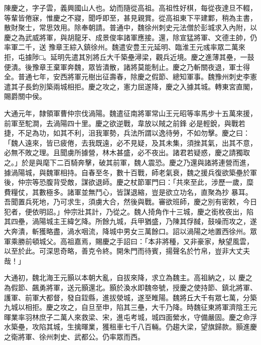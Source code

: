 
\begin{pinyinscope}

 陳慶之，字子雲，義興國山人也。幼而隨從高祖。高祖性好棋，每從夜達旦不輟，等輩皆倦寐，惟慶之不寢，聞呼即至，甚見親賞。從高祖東下平建鄴，稍為主書，散財聚士，常思效用。除奉朝請。普通中，魏徐州刺史元法僧於彭城求入內附，以慶之為武威將軍，與胡龍牙、成景俊率諸軍應接。還，除宣猛將軍、文德主帥，仍率軍二千，送
 豫章王綜入鎮徐州。魏遣安豊王元延明、臨淮王元彧率眾二萬來拒，屯據陟□。延明先遣其別將丘大千築壘潯梁，觀兵近境。慶之進薄其壘，一鼓便潰。後豫章王棄軍奔魏，眾皆潰散，諸將莫能制止。慶之乃斬關夜退，軍士得全。普通七年，安西將軍元樹出征壽春，除慶之假節、總知軍事。魏豫州刺史李憲遣其子長鈞別築兩城相拒。慶之攻之，憲力屈遂降，慶之入據其城。轉東宮直閣，賜爵關中侯。



 大通元年，隸領軍曹仲宗伐渦陽。魏遣征南將軍常山王元昭等率馬步十五萬來援，前軍至駝澗，去渦陽四十里。慶之欲逆戰，韋放以賊之前鋒
 必是輕銳，與戰若捷，不足為功，如其不利，沮我軍勢，兵法所謂以逸待勞，不如勿擊。慶之曰：「魏人遠來，皆已疲倦，去我既遠，必不見疑，及其未集，須挫其氣，出其不意，必無不敗之理。且聞虜所據營，林木甚盛，必不夜出。諸君若疑惑，慶之請獨取之。」於是與麾下二百騎奔擊，破其前軍，魏人震恐。慶之乃還與諸將連營而進，據渦陽城，與魏軍相持。自春至冬，數十百戰，師老氣衰，魏之援兵復欲築壘於軍後，仲宗等恐腹背受敵，謀欲退師。慶之杖節軍門曰：「共來至此，涉歷一歲，糜費糧仗，其數極多。諸軍並無鬥心，皆謀退縮，豈是欲立功名，直聚為抄
 暴耳。吾聞置兵死地，乃可求生，須虜大合，然後與戰。審欲班師，慶之別有密敕，今日犯者，便依明詔。」仲宗壯其計，乃從之。魏人掎角作十三城，慶之銜枚夜出，陷其四壘，渦陽城主王緯乞降。所餘九城，兵甲猶盛，乃陳其俘馘，鼓噪而攻之，遂大奔潰，斬獲略盡，渦水咽流，降城中男女三萬餘口。詔以渦陽之地置西徐州。眾軍乘勝前頓城父。高祖嘉焉，賜慶之手詔曰：「本非將種，又非豪家，觖望風雲，以至於此。可深思奇略，善克令終。開朱門而待賓，揚聲名於竹帛，豈非大丈夫哉！」



 大通初，魏北海王元顥以本朝大亂，自拔來降，求立為魏主。高祖納之，以
 慶之為假節、飆勇將軍，送元顥還北。顥於渙水即魏帝號，授慶之使持節、鎮北將軍、護軍、前軍大都督，發自銍縣，進拔滎城，遂至睢陽。魏將丘大千有眾七萬，分築九城以相拒。慶之攻之，自旦至申，陷其三壘，大千乃降。時魏征東將軍濟陰王元暉業率羽林庶子二萬人來救梁、宋，進屯考城，城四面縈水，守備嚴固。慶之命浮水築壘，攻陷其城，生擒暉業，獲租車七千八百輛。仍趨大梁，望旗歸款。顥進慶之衛將軍、徐州刺史、武都公。仍率眾而西。




\end{pinyinscope}
